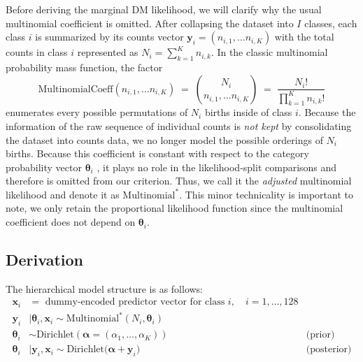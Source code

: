 Before deriving the marginal DM likelihood, we will clarify why the usual multinomial coefficient is omitted. After collapsing the dataset into \(I\)  classes, each class \(i\) is summarized by its counts vector \(\mathbf{y}_i = (n_{i,1}, \dots n_{i,K})\) with the total counts in class \(i\) represented as \(N_i = \sum_{k=1}^K n_{i,k}\). In the classic multinomial probability mass function, the factor 
\begin{equation*}
    \label{eq:multinomial-coef}
    \mathrm{MultinomialCoeff}(n_{i,1}, \dots n_{i,K})
  \;=\;
        \binom{N_i}{n_{i,1}, \dots n_{i,K}}
 \;=\; 
        \frac{N_i!}{\prod_{k=1}^K n_{i,k}!}
\end{equation*} 
enumerates every possible permutations of \(N_i\) births inside of class \(i\). Because the information of the raw sequence of individual counts is \emph{not kept} by consolidating the dataset into counts data, we no longer model the possible orderings of \(N_i\) births. Because this coefficient is constant with respect to the category probability vector \(\boldsymbol{\theta}_i\) \citep{wiki:dirichlet-multinomial}, it plays no role in the likelihood-split comparisons and therefore is omitted from our criterion. Thus, we call it the \emph{adjusted} multinomial likelihood and denote it as \(\mathrm{Multinomial}^\ast\). This minor technicality is important to note, we only retain the proportional likelihood function since the multinomial coefficient does not depend on \(\boldsymbol{\theta}_i\).


\subsection{Derivation}
\label{sec:ch2-likelihood-derivation}

The hierarchical model structure is as follows: 
\begin{align*}
    \mathbf{x}_i &=\text{ dummy-encoded predictor vector for class } i, \quad i = 1,\dots,128 \\
    \mathbf{y}_i &\mid \boldsymbol{\theta}_i, \mathbf{x}_i \sim \mathrm{Multinomial}^\ast \left(N_i, \boldsymbol{\theta}_i\right)\\
    \boldsymbol{\theta}_i  &\sim \mathrm{Dirichlet}\left(\boldsymbol{\alpha}= (\alpha_1, \dots, \alpha_K)\right) \quad  & \text{(prior)}\\
    \boldsymbol{\theta}_i &\mid \mathbf{y}_i, \mathbf{x}_i \sim \mathrm{Dirichlet}\bigl(\boldsymbol{\alpha} + \mathbf{y}_i \bigr) \quad & \text{(posterior)}
\end{align*}

